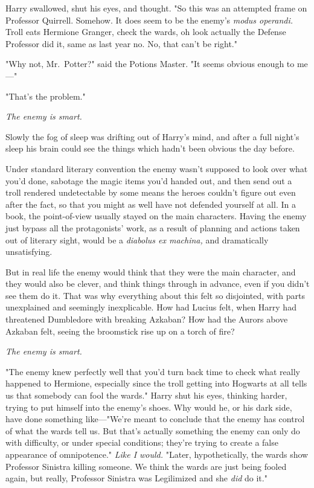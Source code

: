 Harry swallowed, shut his eyes, and thought. "So this was an attempted frame on
Professor Quirrell. Somehow. It does seem to be the enemy's \emph{modus
operandi.} Troll eats Hermione Granger, check the wards, oh look actually the
Defense Professor did it, same as last year{\el} no. No, that can't be
right."

"Why not, Mr.~Potter?" said the Potions Master. "It seems obvious enough to
me---"

"That's the problem."

\emph{The enemy is smart.}

Slowly the fog of sleep was drifting out of Harry's mind, and after a full
night's sleep his brain could see the things which hadn't been obvious the day
before.

Under standard literary convention{\el} the enemy wasn't supposed to look
over what you'd done, sabotage the magic items you'd handed out, and then send
out a troll rendered undetectable by some means the heroes couldn't figure out
even after the fact, so that you might as well have not defended yourself at
all. In a book, the point-of-view usually stayed on the main characters. Having
the enemy just bypass all the protagonists' work, as a result of planning and
actions taken out of literary sight, would be a \emph{diabolus ex machina,} and
dramatically unsatisfying.

But in real life the enemy would think that they were the main character, and
they would also be clever, and think things through in advance, even if you
didn't see them do it. That was why everything about this felt so disjointed,
with parts unexplained and seemingly inexplicable. How had Lucius felt, when
Harry had threatened Dumbledore with breaking Azkaban? How had the Aurors above
Azkaban felt, seeing the broomstick rise up on a torch of fire?

\emph{The enemy is smart.}

"The enemy knew perfectly well that you'd turn back time to check what really
happened to Hermione, especially since the troll getting into Hogwarts at all
tells us that somebody can fool the wards." Harry shut his eyes, thinking
harder, trying to put himself into the enemy's shoes. Why would he, or his dark
side, have done something like---"We're meant to conclude that the enemy has
control of what the wards tell us. But that's actually something the enemy can
only do with difficulty, or under special conditions; they're trying to create
a false appearance of omnipotence." \emph{Like I would.} "Later,
hypothetically, the wards show Professor Sinistra killing someone. We think the
wards are just being fooled again, but really, Professor Sinistra was
Legilimized and she \emph{did} do it."

